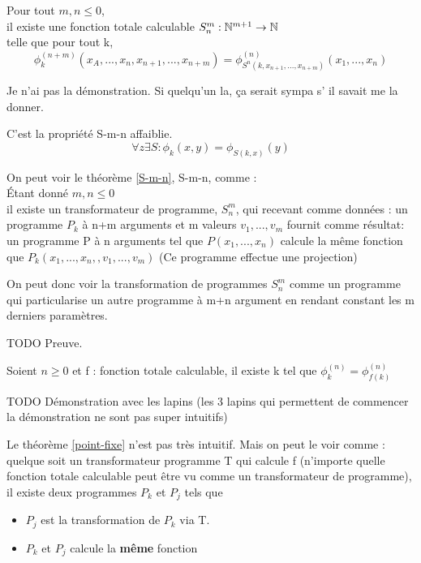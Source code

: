 \begin{mytheo}[S-m-n] 
	\label{S-m-n}Pour tout $m,n \leq 0$, \\
	il existe une fonction totale calculable $S^m_n : \mathbb{N}^{m+1} \rightarrow 
	\mathbb{N}$ \\
	telle que pour tout k,
	$$ \phi^{(n+m)}_k(x_A,...,x_n,x_{n+1},...,x_{n+m}) = 
	\phi^{(n)}_{S^n(k,x_{n+1}, ...,x_{n+m})} (x_1,...,x_n)$$
\end{mytheo}

Je n'ai pas la démonstration. Si quelqu'un la, ça serait sympa s’ il savait me
la donner.

\begin{mytheo}[S]
	C'est la propriété S-m-n affaiblie.
	\[ \forall z \exists S : \phi_k(x,y)=\phi_{S(k,x)}(y)\]
\end{mytheo}

\begin{myrem}
	On peut voir le théorème \ref{S-m-n}, S-m-n, comme : \\
	Étant donné $m,n \leq 0$\\
	il existe un transformateur de programme, $S^m_n$, qui recevant comme 
	données : un programme $P_k$ à n+m arguments et m valeurs $v_1,...,v_m$
	fournit comme résultat: un programme P à n arguments tel que 
	$P(x_1,...,x_n)$ calcule la même fonction que 
	$P_k(x_1,...,x_n,,v_1,...,v_m)$ (Ce programme effectue une projection)
\end{myrem}

\begin{myrem}
	On peut donc voir la transformation de programmes $S^m_n$ comme un 
	programme qui particularise un autre programme à m+n argument en rendant 
	constant les m derniers paramètres.
\end{myrem}
TODO Preuve.

\begin{mytheo} 
	\label{point-fixe}Soient $n \geq 0$ et f : fonction totale 
	calculable, il existe k tel que $\phi^{(n)}_k = \phi^{(n)}_{f(k)}$  
\end{mytheo}

TODO Démonstration avec les lapins (les 3 lapins qui permettent
de commencer la démonstration ne sont pas super intuitifs)
\begin{myrem}
	Le théorème \ref{point-fixe} n'est pas très intuitif. Mais on peut le 
	voir comme : quelque soit un transformateur programme T qui calcule f 
	(n'importe quelle fonction totale calculable peut être vu comme un transformateur 
	de programme), \\
	il existe deux programmes $P_k$ et $P_j$ tels que 
	\begin{itemize}
		\item $P_j$ est la transformation de $P_k$ via T.
		\item $P_k$ et $P_j$ calcule la \textbf{même} fonction
	\end{itemize}
\end{myrem}

